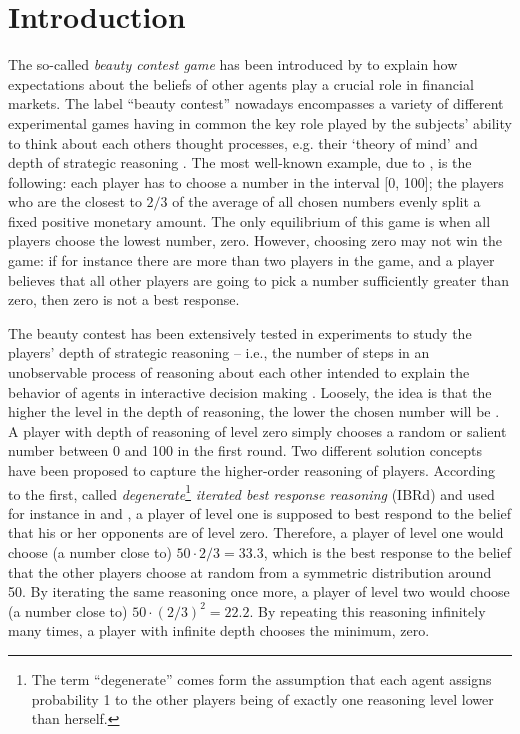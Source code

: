 \documentclass[12pt,review]{elsarticle}
\begin{document}
\section{Introduction\label{sec:Introduction}}
\noindent
The so-called \emph{beauty contest game} has been introduced by \citet{Keynes:1936} to explain how expectations about the beliefs of other agents play a crucial role in financial markets. The label \textquotedblleft beauty contest\textquotedblright{} nowadays encompasses a variety of different experimental games having in common the key role played by the subjects' ability to think about each others thought processes, e.g. their `theory of mind' and depth of strategic reasoning  \citep{NagelEtAl02, CamererHoChong2004, DuffyNagel97, NagelGrosskopf2008, HoCamererWeigelt98, Nagel95, Rapoport06}. The most well-known example, due to \citet{Moulin86}, is the following: each player has to choose a number in the interval {[}0, 100{]}; the players who are the closest to $2/3$ of the average of all chosen numbers evenly split a fixed positive monetary amount. The only equilibrium of this game is when all players choose the lowest number, zero. However,
choosing zero may not win the game: if for instance there are more than two players in the game, and a player believes that all other players are going to pick a number sufficiently greater than zero, then zero is not a best response.

The beauty contest has been extensively tested in experiments to study the players' depth of strategic reasoning -- i.e., the number of steps in an unobservable process of reasoning about each other intended to explain the behavior of agents in interactive decision making \citep{NagelEtAl02, CamererHoChong2004, NagelGrosskopf2008, HoCamererWeigelt98, Nagel95}. Loosely, the idea is that the higher the level in the depth of reasoning, the lower the chosen number will be \citep{BURNHAMetAl2009-BCgame}. A player with depth of reasoning of level zero simply chooses a random
or salient number between 0 and 100 in the first round. Two different solution concepts have been proposed to capture the higher-order reasoning of players. According to the first, called \emph{degenerate}\footnote{The term ``degenerate'' comes form the assumption that each agent assigns probability 1 to the other players being of exactly one reasoning level lower than herself.} \emph{iterated best response reasoning} (IBRd) and used for instance in \citet{Nagel95} and \citet{NagelEtAl02}, a player of level one is supposed to best respond to the belief that his or her opponents are of level zero. Therefore, a player of level one would choose (a number close to) $50\cdot2/3=33.3$, which is the best response to the belief that the other players choose at random from a symmetric distribution around 50. By iterating the same reasoning once more, a player of level two would choose (a number close to) $50\cdot(2/3)^{2}=22.2$. By repeating this reasoning infinitely many times, a player with infinite depth chooses the minimum, zero. 
\end{document}
